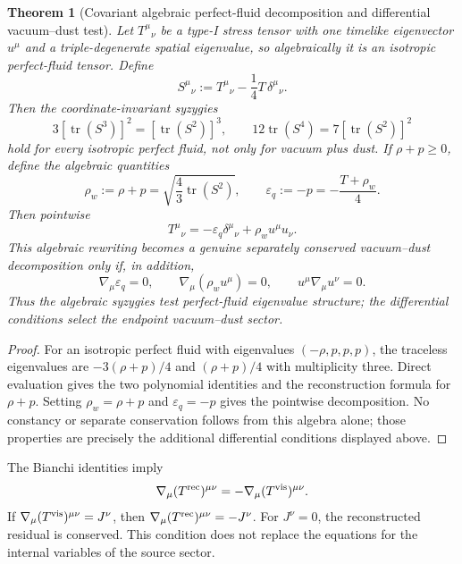 \documentclass[11pt,a4paper]{article}
\numberwithin{equation}{section}
\theoremstyle{definition}
\theoremstyle{plain}
\newtheorem{theorem}[criterion]{Theorem}
\theoremstyle{remark}
\begin{document}
\begin{theorem}[Covariant algebraic perfect-fluid decomposition and differential vacuum--dust test]
Let \(T^\mu{}_{\nu}\) be a type-I stress tensor with one timelike eigenvector \(u^\mu\) and a triple-degenerate spatial eigenvalue, so algebraically it is an isotropic perfect-fluid tensor. Define
\begin{equation}
S^\mu{}_{\nu}
:=T^\mu{}_{\nu}-\frac14T\,\delta^\mu{}_{\nu}.
\end{equation}
Then the coordinate-invariant syzygies
\begin{equation}
\boxed{
3[\operatorname{tr}(S^3)]^2=[\operatorname{tr}(S^2)]^3,
\qquad
12\operatorname{tr}(S^4)=7[\operatorname{tr}(S^2)]^2
}
\end{equation}
hold for every isotropic perfect fluid, not only for vacuum plus dust. If \(\rho+p\ge0\), define the algebraic quantities
\begin{equation}
\boxed{
\rho_w:=\rho+p
=\sqrt{\frac43\operatorname{tr}(S^2)},
\qquad
\varepsilon_q:=-p=-\frac{T+\rho_w}{4}.
}
\end{equation}
Then pointwise
\begin{equation}
T^\mu{}_{\nu}
=-\varepsilon_q\delta^\mu{}_{\nu}+\rho_wu^\mu u_{\nu}.
\end{equation}
This algebraic rewriting becomes a genuine separately conserved vacuum--dust decomposition only if, in addition,
\begin{equation}
\boxed{
\nabla_\mu\varepsilon_q=0,
\qquad
\nabla_\mu(\rho_wu^\mu)=0,
\qquad
u^\mu\nabla_\mu u^\nu=0.
}
\end{equation}
Thus the algebraic syzygies test perfect-fluid eigenvalue structure; the differential conditions select the endpoint vacuum--dust sector.
\end{theorem}
\begin{proof}
For an isotropic perfect fluid with eigenvalues \((-\rho,p,p,p)\), the traceless eigenvalues are \(-3(\rho+p)/4\) and \((\rho+p)/4\) with multiplicity three. Direct evaluation gives the two polynomial identities and the reconstruction formula for \(\rho+p\). Setting \(\rho_w=\rho+p\) and \(\varepsilon_q=-p\) gives the pointwise decomposition. No constancy or separate conservation follows from this algebra alone; those properties are precisely the additional differential conditions displayed above.
\end{proof}


The Bianchi identities imply
\begin{equation}
\nabla_\mu(T^{\rm rec})^{\mu\nu}=-\nabla_\mu(T^{\rm vis})^{\mu\nu}.
\end{equation}
If \(\nabla_\mu(T^{\rm vis})^{\mu\nu}=J^\nu\), then \(\nabla_\mu(T^{\rm rec})^{\mu\nu}=-J^\nu\). For \(J^\nu=0\), the reconstructed residual is conserved. This condition does not replace the equations for the internal variables of the source sector.
\end{document}
